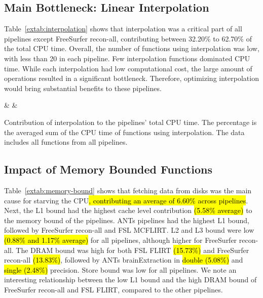 \documentclass[conference]{IEEEtran}
\newcommand{\HL}[1]{\hl{#1}}
\begin{document}
\subsection{Main Bottleneck: Linear Interpolation}
Table~\ref{extab:interpolation} shows that interpolation was a critical part of all pipelines except FreeSurfer recon-all, contributing between 32.20\% to 62.70\% of the total CPU time. Overall, the number of functions using interpolation was low, with less than 20 in each pipeline. Few interpolation functions dominated CPU time. While each interpolation had low computational cost, the large amount of operations resulted in a significant bottleneck. Therefore, optimizing interpolation would bring substantial benefits to these pipelines. 

\begin{table}[ht]
	\centering
	{\pipeline & \nfunc & \tablenum[round-precision=2]{\cputime}}
	\caption{Contribution of interpolation to the pipelines' total CPU time. The percentage is the averaged sum of the CPU time of functions using interpolation. The data includes all functions from all pipelines.}
	\label{extab:interpolation}
\end{table}

\subsection{Impact of Memory Bounded Functions}
Table~\ref{extab:memory-bound} shows that fetching data from disks was the main cause for starving the CPU\HL{, contributing an average of 6.60\% across pipelines}. Next, the L1 bound had the highest cache level contribution \HL{(5.58\% average)} to the memory bound of the pipelines. ANTs pipelines had the highest L1 bound, followed by FreeSurfer recon-all and FSL MCFLIRT. L2 and L3 bound were low \HL{(0.88\% and 1.17\% average)} for all pipelines, although higher for FreeSurfer recon-all. The DRAM bound was high for both FSL FLIRT \HL{(15.73\%)} and FreeSurfer recon-all \HL{(13.83\%)}, followed by ANTs brainExtraction in \HL{double (5.08\%)} and \HL{single (2.48\%)} precision. Store bound was low for all pipelines. We note an interesting relationship between the low L1 bound and the high DRAM bound of FreeSurfer recon-all and FSL FLIRT, compared to the other pipelines.
\end{document}
